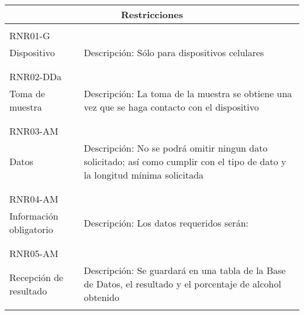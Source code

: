   
  \begin{center}
   \begin{tabular}{|p{5.5cm}|p{7cm}|}
     \hline
     \multicolumn{2}{|c|}{Restricciones} \\ \hline
     \\ RNR01-G \\ Dispositivo & Descripción: Sólo para dispositivos celulares \\ \\ \hline
     \\ RNR02-DDa \\ Toma de muestra & Descripción: La toma de la muestra se obtiene una vez que se haga contacto con el dispositivo \\ \\ \hline
     \\ RNR03-AM \\ Datos & Descripción: No se podrá omitir ningun dato solicitado; así como cumplir con el tipo de dato y la longitud mínima solicitada \\ \\ \hline
     \\ RNR04-AM \\ Información obligatorio & Descripción: Los datos requeridos serán: \\ \\ \hline
     \\ RNR05-AM \\ Recepción de resultado & Descripción: Se guardará en una tabla de la Base de Datos, el resultado y el porcentaje de alcohol obtenido \\ \\ \hline
     
   \end{tabular}
 \end{center}  
